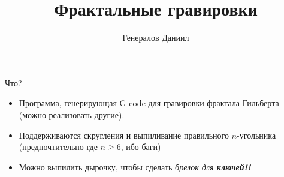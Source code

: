 \documentclass[11pt]{beamer}
\author{Генералов Даниил}
\title{Фрактальные гравировки}
\begin{document}
\begin{frame}
\titlepage
\end{frame}


\begin{frame}{Что?}
\begin{itemize}
\item Программа, генерирующая G-code для гравировки фрактала Гильберта (можно реализовать другие).
\item Поддерживаются скругления и выпиливание правильного $n$-угольника (предпочтительно где $n \ge 6$, ибо баги)
\item Можно выпилить дырочку, чтобы сделать \textit{брелок для \textbf{ключей!!}}

\end{itemize}

\end{frame}
\end{document}
